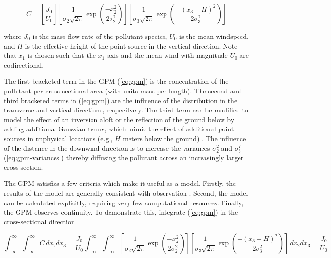 \documentclass[]{aiaa-tc}%
\newcommand{\eqnref}[1]{(\ref{#1})}
\begin{document}
\begin{equation} \label{eq:gpm}
  C = \left[ \frac{J_0}{U_0} \right] \left[ \frac{1}{\sigma_2 \sqrt{2 \pi}} \exp \left( \frac{-x_2^2}{2 \sigma_2^2} \right) \right] \left[ \frac{1}{\sigma_3 \sqrt{2 \pi}} \exp \left( \frac{- (x_3 - H)^2}{2 \sigma_3^2} \right) \right]
\end{equation}

where $J_0$ is the mass flow rate of the pollutant species, $U_0$ is the mean windspeed, and $H$ is the effective height of the point source in the vertical direction. Note that $x_1$ is chosen such that the $x_1$ axis and the mean wind with magnitude $U_0$ are codirectional.

The first bracketed term in the GPM \eqnref{eq:gpm} is the concentration of the pollutant per cross sectional area (with units mass per length). The second and third bracketed terms in \eqnref{eq:gpm} are the influence of the distribution in the transverse and vertical directions, respecitvely. The third term can be modified to model the effect of an inversion aloft or the reflection of the ground below by adding additional Gaussian terms, which mimic the effect of additional point sources in unphysical locations (e.g., $H$ meters below the ground) \cite{cimorelli_aermod_2005}. The influence of the distance in the downwind direction is to increase the variances $\sigma_2^2$ and $\sigma_3^2$ \eqnref{eq:gpm-variances} thereby diffusing the pollutant across an increasingly larger cross section. 

The GPM satisfies a few criteria which make it useful as a model. Firstly, the results of the model are generally consistent with observation \cite{sinha_application_2025, cimorelli_aermod_2005, kawka_downscaling_2023, lotrecchiano_pollution_2020, salih_air_2025}. Second, the model can be calculated explicitly, requiring very few computational resources. Finally, the GPM observes continuity. To demonstrate this, integrate \eqnref{eq:gpm} in the cross-sectional direction

\begin{equation} \label{eq:gpm-integral}
  \int_{-\infty}^\infty \int_{-\infty}^\infty C \,  dx_2 dx_3 = \frac{J_0}{U_0} \int_{-\infty}^\infty \int_{-\infty}^\infty \left[ \frac{1}{\sigma_2 \sqrt{2 \pi}} \exp \left( \frac{-x_2^2}{2 \sigma_2^2} \right) \right] \left[ \frac{1}{\sigma_3 \sqrt{2 \pi}} \exp \left( \frac{- (x_3 - H)^2}{2 \sigma_3^2} \right) \right] \, dx_2 dx_3 = \frac{J_0}{U_0}
\end{equation}
\end{document}
